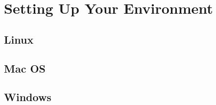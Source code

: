 \documentclass[../main.tex]{subfiles}
\begin{document}
\chapter{Setting Up Your Environment}
\section{Linux}
\section{Mac OS}
\section{Windows}
\end{document}
